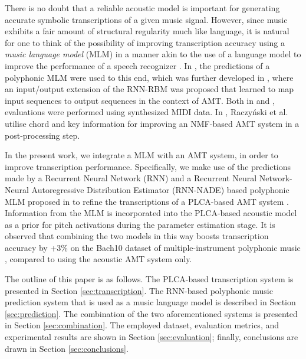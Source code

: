 There is no doubt that a reliable acoustic model is important for generating accurate symbolic transcriptions of a given music signal. However, since music exhibits a fair amount of structural regularity much like language, it is natural for one to think of the possibility of improving transcription accuracy using a \textit{music language model} (MLM) in a manner akin to the use of a language model to improve the performance of a speech recognizer \cite{Rabiner1993}. In \cite{Boulanger-Lewandowski2012}, the predictions of a polyphonic MLM were used to this end, which was further developed in \cite{Boulanger-Lewandowski2013}, where an input/output extension of the RNN-RBM was proposed that learned to map input sequences to output sequences in the context of AMT. Both in \cite{Boulanger-Lewandowski2012} and \cite{Boulanger-Lewandowski2013}, evaluations were performed using synthesized MIDI data. In \cite{Raczynski13}, Raczy\'{n}ski et al. utilise chord and key information for improving an NMF-based AMT system in a post-processing step.


In the present work, we integrate a MLM with an AMT system, in order to improve transcription performance. Specifically, we make use of the predictions made by a Recurrent Neural Network (RNN) and a Recurrent Neural Network-Neural Autoregressive Distribution Estimator (RNN-NADE) based polyphonic MLM proposed in \cite{Boulanger-Lewandowski2012} to refine the transcriptions of a PLCA-based AMT system \cite{Benetos2012, Benetos2013}. Information from the MLM is incorporated into the PLCA-based acoustic model as a prior for pitch activations during the parameter estimation stage. It is observed that combining the two models in this way boosts transcription accuracy by +3\% on the Bach10 dataset of multiple-instrument polyphonic music \cite{Duan2010}, compared to using the acoustic AMT system only.

The outline of this paper is as follows. The PLCA-based transcription system is presented in Section \ref{sec:transcription}. The RNN-based polyphonic music prediction system that is used as a music language model is described in Section \ref{sec:prediction}. The combination of the two aforementioned systems is presented in Section \ref{sec:combination}. The employed dataset, evaluation metrics, and experimental results are shown in Section \ref{sec:evaluation}; finally, conclusions are drawn in Section \ref{sec:conclusions}.